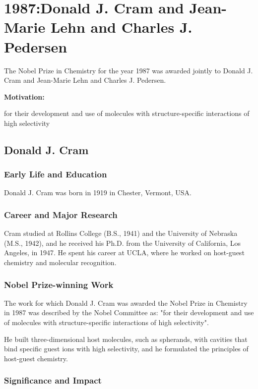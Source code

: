 \chapter{1987:Donald J. Cram and Jean-Marie Lehn and Charles J. Pedersen}

\label{chap:chemistry1987}

The Nobel Prize in Chemistry for the year 1987 was awarded jointly to Donald J. Cram and Jean-Marie Lehn and Charles J. Pedersen.

\textbf{Motivation:}

for their development and use of molecules with structure-specific interactions of high selectivity

\section{Donald J. Cram}

\subsection*{Early Life and Education}

Donald J. Cram was born in 1919 in Chester, Vermont, USA.

\subsection*{Career and Major Research}

Cram studied at Rollins College (B.S., 1941) and the University of Nebraska (M.S., 1942), and he received his Ph.D. from the University of California, Los Angeles, in 1947. He spent his career at UCLA, where he worked on host-guest chemistry and molecular recognition.

\subsection*{Nobel Prize-winning Work}

The work for which Donald J. Cram was awarded the Nobel Prize in Chemistry in 1987 was described by the Nobel Committee as: "for their development and use of molecules with structure-specific interactions of high selectivity".

He built three-dimensional host molecules, such as spherands, with cavities that bind specific guest ions with high selectivity, and he formulated the principles of host-guest chemistry.

\subsection*{Significance and Impact}

